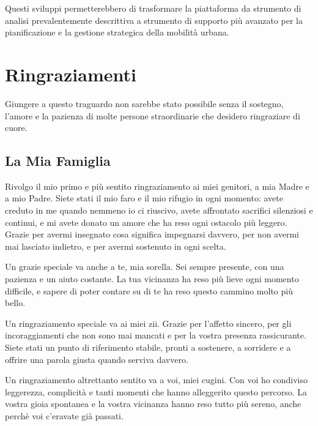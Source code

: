 \documentclass[12pt, oneside]{extbook}
\begin{document}
Questi sviluppi permetterebbero di trasformare la piattaforma da strumento di analisi prevalentemente descrittiva a strumento di supporto più avanzato per la pianificazione e la gestione strategica della mobilità urbana.

\newpage
\thispagestyle{empty}
\mbox{}
\newpage

\chapter*{Ringraziamenti}

Giungere a questo traguardo non sarebbe stato possibile senza il sostegno, l'amore e la pazienza di molte persone straordinarie che desidero ringraziare di cuore.

\section*{La Mia Famiglia}

Rivolgo il mio primo e più sentito ringraziamento ai miei genitori, a mia Madre e a mio Padre. Siete stati il mio faro e il mio rifugio in ogni momento: avete creduto in me quando nemmeno io ci riuscivo, avete affrontato sacrifici silenziosi e continui, e mi avete donato un amore che ha reso ogni ostacolo più leggero.
Grazie per avermi insegnato cosa significa impegnarsi davvero, per non avermi mai lasciato indietro, e per avermi sostenuto in ogni scelta.
\vspace{0.5cm}

Un grazie speciale va anche a te, mia sorella. Sei sempre presente, con una pazienza e un aiuto costante. La tua vicinanza ha reso più lieve ogni momento difficile, e sapere di poter contare su di te ha reso questo cammino molto più bello.

\vspace{0.5cm}

Un ringraziamento speciale va ai miei zii. Grazie per l’affetto sincero, per gli incoraggiamenti che non sono mai mancati e per la vostra presenza rassicurante. Siete stati un punto di riferimento stabile, pronti a sostenere, a sorridere e a offrire una parola giusta quando serviva davvero.
\newpage


Un ringraziamento altrettanto sentito va a voi, miei cugini. Con voi ho condiviso leggerezza, complicità e tanti momenti che hanno alleggerito questo percorso. La vostra gioia spontanea e la vostra vicinanza hanno reso tutto più sereno, anche perchè voi c'eravate già passati.
\vspace{0.5cm}
\end{document}
